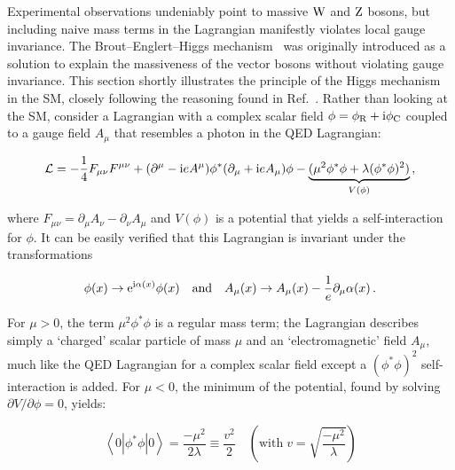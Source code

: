 Experimental observations undeniably point to massive $\mathrm{W}$ and $\mathrm{Z}$ bosons, but including naive mass terms in the Lagrangian manifestly violates local gauge invariance.
% 
The Brout--Englert--Higgs mechanism~\cite{Higgs:1964pj,Englert:1964et,Guralnik:1964eu} was originally introduced as a solution to explain the massiveness of the vector bosons without violating gauge invariance.
% 
This section shortly illustrates the principle of the Higgs mechanism in the SM, closely following the reasoning found in Ref.~\cite{Djouadi:2005gi}.
% 
Rather than looking at the SM, consider a Lagrangian with a complex scalar field $\phi = \phi_\mathrm{R} + \mathrm{i} \phi_\mathrm{C}$ coupled to a gauge field $A_\mu$ that resembles a photon in the QED Lagrangian:
% 
\begin{linenomath*}
\begin{equation}
\label{eq:lagrangian-higgs}
\mathcal{L} =
    -\frac{1}{4} F_{\mu\nu} F^{\mu\nu}
    + (\partial^\mu - \mathrm{i} e A^\mu) \phi^\ast (\partial_\mu + \mathrm{i} e A_\mu) \phi
    - \underbrace{(\mu^2 \phi^\ast \phi + \lambda (\phi^\ast \phi)^2)}_{V(\phi)}
\,,
\end{equation}
\end{linenomath*}
% 
where $F_{\mu\nu} = \partial_\mu A_\nu - \partial_\nu A_\mu$ and $V(\phi)$ is a potential that yields a self-interaction for $\phi$.
% 
It can be easily verified that this Lagrangian is invariant under the transformations
% 
\begin{linenomath*}
\begin{equation}
\label{eq:transformations-higgs}
\phi(x) \to \mathrm{e}^{\mathrm{i} \alpha(x)} \phi(x)
\quad \text{and} \quad 
A_\mu(x) \to A_\mu(x) - \frac{1}{e} \partial_\mu \alpha(x)
\,.
\end{equation}
\end{linenomath*}
% 
For $\mu > 0$, the term $\mu^2 \phi^\ast \phi$ is a regular mass term; the Lagrangian describes simply a `charged' scalar particle of mass $\mu$ and an `electromagnetic' field $A_\mu$, much like the QED Lagrangian for a complex scalar field except a $(\phi^\ast\phi)^2$ self-interaction is added.
% 
For $\mu < 0$, the minimum of the potential, found by solving $\partial V / \partial \phi = 0$, yields:
% 
\begin{linenomath*}
\begin{equation}
\left< 0 | \phi^\ast\phi | 0 \right> = \frac{-\mu^2}{2\lambda}  \equiv  \frac{v^2}{2}
\quad \left( \text{with} \; v = \sqrt{\frac{-\mu^2}{\lambda}} \right)
\end{equation}
\end{linenomath*}
